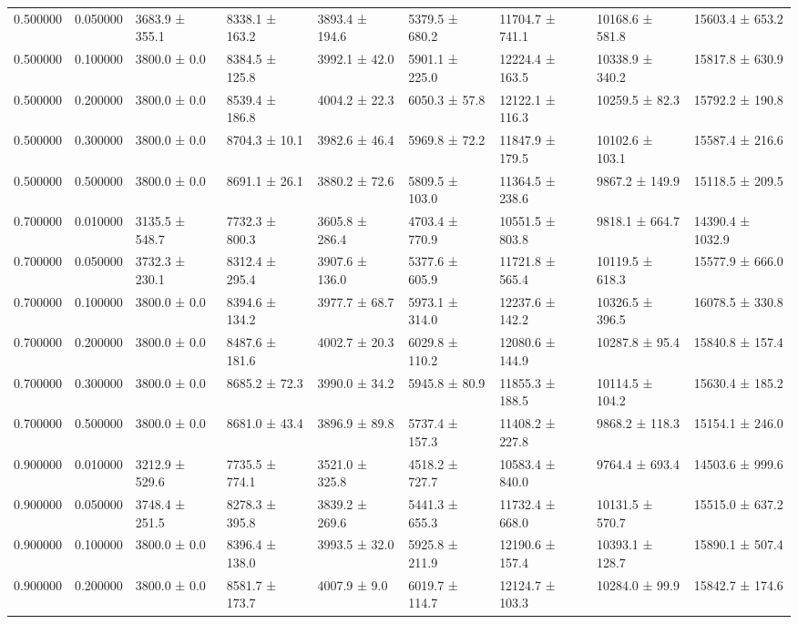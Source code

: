 \begin{table}
\begin{tabular}{rrlllllll}
0.500000 & 0.050000 & 3683.9 ± 355.1 & 8338.1 ± 163.2 & 3893.4 ± 194.6 & 5379.5 ± 680.2 & 11704.7 ± 741.1 & 10168.6 ± 581.8 & 15603.4 ± 653.2 \\
0.500000 & 0.100000 & 3800.0 ± 0.0 & 8384.5 ± 125.8 & 3992.1 ± 42.0 & 5901.1 ± 225.0 & 12224.4 ± 163.5 & 10338.9 ± 340.2 & 15817.8 ± 630.9 \\
0.500000 & 0.200000 & 3800.0 ± 0.0 & 8539.4 ± 186.8 & 4004.2 ± 22.3 & 6050.3 ± 57.8 & 12122.1 ± 116.3 & 10259.5 ± 82.3 & 15792.2 ± 190.8 \\
0.500000 & 0.300000 & 3800.0 ± 0.0 & 8704.3 ± 10.1 & 3982.6 ± 46.4 & 5969.8 ± 72.2 & 11847.9 ± 179.5 & 10102.6 ± 103.1 & 15587.4 ± 216.6 \\
0.500000 & 0.500000 & 3800.0 ± 0.0 & 8691.1 ± 26.1 & 3880.2 ± 72.6 & 5809.5 ± 103.0 & 11364.5 ± 238.6 & 9867.2 ± 149.9 & 15118.5 ± 209.5 \\
0.700000 & 0.010000 & 3135.5 ± 548.7 & 7732.3 ± 800.3 & 3605.8 ± 286.4 & 4703.4 ± 770.9 & 10551.5 ± 803.8 & 9818.1 ± 664.7 & 14390.4 ± 1032.9 \\
0.700000 & 0.050000 & 3732.3 ± 230.1 & 8312.4 ± 295.4 & 3907.6 ± 136.0 & 5377.6 ± 605.9 & 11721.8 ± 565.4 & 10119.5 ± 618.3 & 15577.9 ± 666.0 \\
0.700000 & 0.100000 & 3800.0 ± 0.0 & 8394.6 ± 134.2 & 3977.7 ± 68.7 & 5973.1 ± 314.0 & 12237.6 ± 142.2 & 10326.5 ± 396.5 & 16078.5 ± 330.8 \\
0.700000 & 0.200000 & 3800.0 ± 0.0 & 8487.6 ± 181.6 & 4002.7 ± 20.3 & 6029.8 ± 110.2 & 12080.6 ± 144.9 & 10287.8 ± 95.4 & 15840.8 ± 157.4 \\
0.700000 & 0.300000 & 3800.0 ± 0.0 & 8685.2 ± 72.3 & 3990.0 ± 34.2 & 5945.8 ± 80.9 & 11855.3 ± 188.5 & 10114.5 ± 104.2 & 15630.4 ± 185.2 \\
0.700000 & 0.500000 & 3800.0 ± 0.0 & 8681.0 ± 43.4 & 3896.9 ± 89.8 & 5737.4 ± 157.3 & 11408.2 ± 227.8 & 9868.2 ± 118.3 & 15154.1 ± 246.0 \\
0.900000 & 0.010000 & 3212.9 ± 529.6 & 7735.5 ± 774.1 & 3521.0 ± 325.8 & 4518.2 ± 727.7 & 10583.4 ± 840.0 & 9764.4 ± 693.4 & 14503.6 ± 999.6 \\
0.900000 & 0.050000 & 3748.4 ± 251.5 & 8278.3 ± 395.8 & 3839.2 ± 269.6 & 5441.3 ± 655.3 & 11732.4 ± 668.0 & 10131.5 ± 570.7 & 15515.0 ± 637.2 \\
0.900000 & 0.100000 & 3800.0 ± 0.0 & 8396.4 ± 138.0 & 3993.5 ± 32.0 & 5925.8 ± 211.9 & 12190.6 ± 157.4 & 10393.1 ± 128.7 & 15890.1 ± 507.4 \\
0.900000 & 0.200000 & 3800.0 ± 0.0 & 8581.7 ± 173.7 & 4007.9 ± 9.0 & 6019.7 ± 114.7 & 12124.7 ± 103.3 & 10284.0 ± 99.9 & 15842.7 ± 174.6 \\

\end{tabular}
\end{table}
